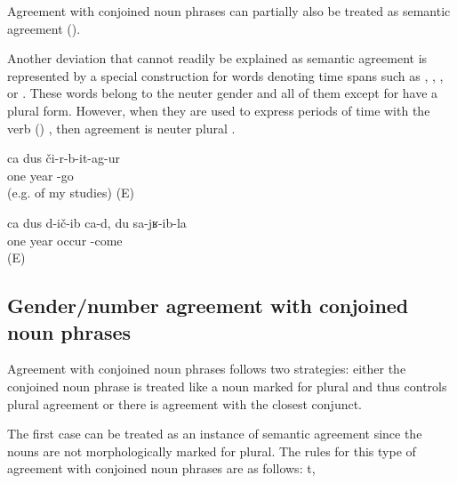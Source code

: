 Agreement with conjoined noun phrases can partially also be treated as semantic agreement ().

Another deviation that cannot readily be explained as semantic agreement is represented by a special construction for words denoting time spans such as  ,  ,  , or  . These words belong to the neuter gender  and all of them except for  have a plural form. However, when they are used to express periods of time with the verb  () , then agreement is neuter plural .
%
\begin{exe}
	\ex	\label{ex:‎One year finished (e.g. of my studies)}
	\gll	ca	dus	či-r-b-it-ag-ur\\
		one	year	-go\\
	\glt	{} (e.g. of my studies) (E)

	\ex	\label{ex:‎One year passed by since I came here}
	\gll	ca	dus	d-ič-ib	ca-d,	du	sa-jʁ-ib-la\\
		one	year	occur			-come\\
	\glt	{} (E)
\end{exe}



\subsection{Gender/number agreement with conjoined noun phrases}
\label{ssec:Gender agreement resolution}

Agreement with conjoined noun phrases follows two strategies: either the conjoined noun phrase is treated like a noun marked for plural and thus controls plural agreement or there is agreement with the closest conjunct.

The first case can be treated as an instance of semantic agreement since the nouns are not morphologically marked for plural. The rules for this type of agreement with conjoined noun phrases are as follows: t,

